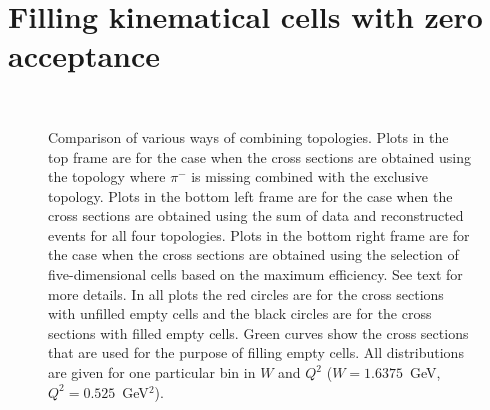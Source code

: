 \section{Filling kinematical cells with zero acceptance}
\label{zero_acc} 

\begin{figure}[htp]
\begin{center}
 \\
\caption{\small Comparison of various ways of combining topologies. Plots in the top frame are for the case when the cross sections are  obtained using the topology where $\pi^{-}$ is missing combined with the exclusive topology. Plots in the bottom left frame are for the case when the cross sections are obtained using the sum of data and reconstructed events for all four topologies. Plots in the bottom right frame are for the case when the cross sections are obtained using the selection of five-dimensional cells based on the maximum efficiency. See text for more details. In all plots the red circles are for the cross sections with unfilled empty cells and the black circles are for the cross sections with filled empty cells. Green curves show the cross sections that are used for the purpose of filling empty cells. All distributions are given for one particular bin in $W$ and $Q^2$ ($W = 1.6375$~GeV, $Q^2 = 0.525$~GeV$^2$).} \label{fig:topologies}

\end{center}
\end{figure}
